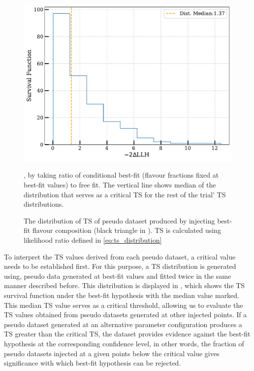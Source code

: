 \begin{figure}[h!]
    
    \includegraphics{./figures/results/median_atbestfit_TS.pdf}


    \caption{The distribution of TS of pseudo dataset produced by injecting best-fit flavour composition (black triangle in ). TS is calculated using likelihood ratio defined in \ref{eq:ts_distribution}}, by taking ratio of conditional best-fit (flavour fractions fixed at best-fit values) to free fit. The vertical line shows median of the distribution that serves as a critical TS for the rest of the trial' TS distributions.
\end{figure}
To interpret the TS values derived from each pseudo dataset, a critical value needs to be established first. For this purpose, a TS distribution is generated using, pseudo data generated at best-fit values and fitted twice in the same manner described before. This distribution is displayed in , which shows the TS survival function under the best-fit hypothesis with the median value marked. This median TS value serves as a critical threshold, allowing us to evaluate the TS values obtained from pseudo datasets generated at other injected points. If a pseudo dataset generated at an alternative parameter configuration produces a TS greater than the critical TS, the dataset provides evidence against the best-fit hypothesis at the corresponding confidence level, in other words, the fraction of pseudo datasets injected at a given points below the critical value gives significance with which best-fit hypothesis can be rejected. 

